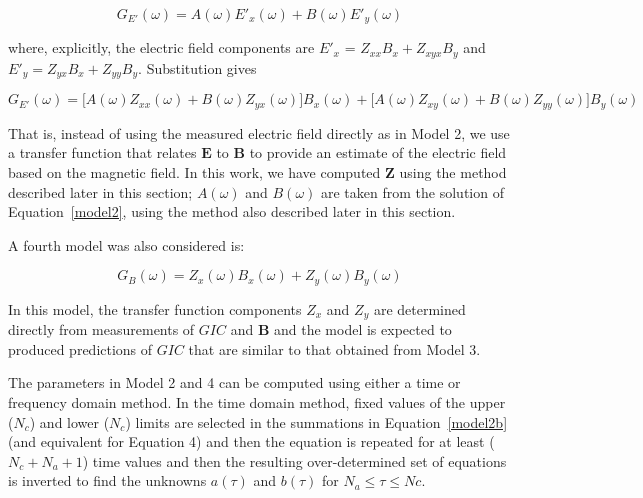 \documentclass[draft,linenumbers]{agujournal2018}
\begin{document}
\setcounter{equation}{2}
\begin{linenomath*}
\begin{equation}
G_{E'}(\omega) = A(\omega)E'_x(\omega) + B(\omega)E'_y(\omega)
\end{equation}
\end{linenomath*}

\noindent
where, explicitly, the electric field components are $E'_x$ = $Z_{xx}B_x + Z_{xyx}B_y$ and $E'_y = Z_{yx}B_x + Z_{yy}B_y$. Substitution gives

\begin{equation*}
G_{E'}(\omega) = \big[A(\omega)Z_{xx}(\omega) + B(\omega)Z_{yx}(\omega) \big] B_x(\omega) + \big[ A(\omega)Z_{xy}(\omega) + B(\omega)Z_{yy}(\omega) \big] B_y(\omega)
\end{equation*}

That is, instead of using the measured electric field directly as in Model 2, we use a transfer function that relates $\mathbf{E}$ to $\mathbf{B}$ to provide an estimate of the electric field based on the magnetic field. In this work, we have computed $\mathbf{Z}$ using the method described later in this section; $A(\omega)$ and $B(\omega)$ are taken from the solution of Equation~\ref{model2}, using the method also described later in this section.

A fourth model was also considered is:

\begin{linenomath*}
\begin{equation}
G_B(\omega) = Z_x(\omega)B_x(\omega) + Z_y(\omega)B_y(\omega)
\end{equation}
\end{linenomath*}

\noindent
In this model, the transfer function components $Z_x$ and $Z_y$ are determined directly from measurements of $GIC$ and $\mathbf{B}$ and the model is expected to produced predictions of $GIC$ that are similar to that obtained from Model 3.

The parameters in Model 2 and 4 can be computed using either a time or frequency domain method. In the time domain method, fixed values of the upper ($N_c$) and lower ($N_c$) limits are selected in the summations in Equation~\ref{model2b} (and equivalent for Equation 4) and then the equation is repeated for at least ($N_c+N_a+1$) time values and then the resulting over-determined set of equations is inverted to find the unknowns $a(\tau)$ and $b(\tau)$ for $N_a \le \tau \le Nc$.
\end{document}
